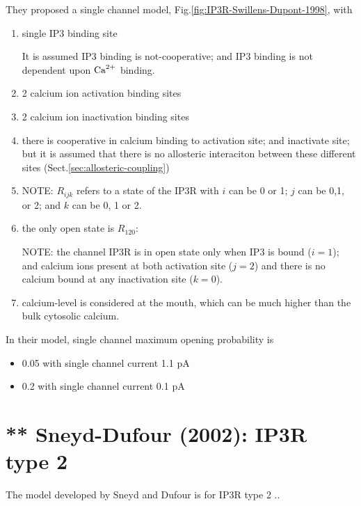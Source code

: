 They proposed a single channel model, Fig.\ref{fig:IP3R-Swillens-Dupont-1998},
with
\begin{enumerate}
  \item single IP3 binding site

It is assumed IP3 binding is not-cooperative; and IP3 binding is not dependent
upon ${\text{Ca}^{2+}}$ binding.
  
  \item 2 calcium ion activation binding sites
  
  \item 2 calcium ion inactivation binding sites
  
  \item there is cooperative in calcium binding to activation site; and
  inactivate site; but it is assumed that there is no allosteric interaciton
  between these different sites (Sect.\ref{sec:allosteric-coupling})

  \item NOTE: $R_{ijk}$ refers to a state of the IP3R with $i$ can be 0 or 1;
  $j$ can be 0,1, or 2; and $k$ can be 0, 1 or 2.


  \item the only open state is $R_{120}$:
  
NOTE: the channel IP3R is in open state only when IP3 is bound ($i=1$); and
calcium ions present at both activation site ($j=2$) and there is no calcium
bound at any inactivation site ($k=0$).
  
  \item calcium-level is considered at the mouth, which can be much higher
  than the bulk cytosolic calcium.
\end{enumerate}

In their model, single channel maximum opening probability is 
\begin{itemize}
  \item 0.05 with single channel current 1.1 pA
  
  \item 0.2 with single channel current 0.1 pA
\end{itemize} 


\section{** Sneyd-Dufour (2002): IP3R type 2}
\label{sec:sneyd-dufour_IP3R_2002}


The model developed by Sneyd and Dufour is for IP3R type 2
\citep{sneyd2002ip3r2}..

